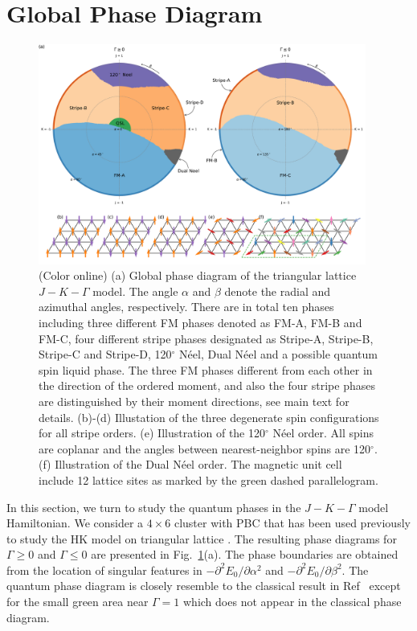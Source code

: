 \documentclass[aps,prb,reprint,amsfonts,amsmath,amssymb,showpacs,groupedaddress,superscriptaddress]{revtex4-1}
\begin{document}
\section{\label{sec:SectionIV}Global Phase Diagram}
\begin{figure}
    \centering
    \includegraphics[width=0.96\textwidth]{Fig2.pdf}
    \caption{\label{fig:PhaseDiagram}(Color online) (a) Global phase diagram of the triangular lattice $J-K-\Gamma$ model. The angle $\alpha$ and $\beta$ denote the radial and azimuthal angles, respectively. There are in total ten phases including three different FM phases denoted as FM-A, FM-B and FM-C, four different stripe phases designated as Stripe-A, Stripe-B, Stripe-C and Stripe-D, 120$^\circ$ N\'{e}el, Dual N\'{e}el and a possible quantum spin liquid phase. The three FM phases different from each other in the direction of the ordered moment, and also the four stripe phases are distinguished by their moment directions, see main text for details. (b)-(d) Illustation of the three degenerate spin configurations for all stripe orders. (e) Illustration of the 120$^\circ$ N\'{e}el order. All spins are coplanar and the angles between nearest-neighbor spins are 120$^\circ$. (f) Illustration of the Dual N\'{e}el order. The magnetic unit cell include 12 lattice sites as marked by the green dashed parallelogram.}
\end{figure}

In this section, we turn to study the quantum phases in the $J-K-\Gamma$ model Hamiltonian. We consider a $4 \times 6$ cluster with PBC that has been used previously to study the HK model on triangular lattice \cite{KaiLi2015}. The resulting phase diagrams for $\Gamma \geq 0$ and $\Gamma \leq 0$ are presented in Fig.~\ref{fig:PhaseDiagram}(a). The phase boundaries are obtained from the location of singular features in $-\partial^2E_0/\partial\alpha^2$ and $-\partial^2E_0/\partial\beta^2$. The quantum phase diagram is closely resemble to the classical result in Ref~ except for the small green area near $\Gamma=1$ which does not appear in the classical phase diagram.
\end{document}
